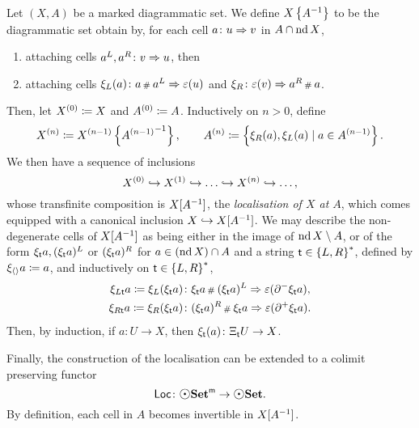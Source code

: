 \begin{dfn}
    Let \( (X, A) \) be a marked diagrammatic set.
    We define \( \preloc{X}{A} \) to be the diagrammatic set obtain by, for each cell \( a \colon u \celto v \) in \( A \cap \nd X \),
    \begin{enumerate}
        \item attaching cells \( a^L, a^R  \colon v \celto u \), then
        \item attaching cells \( \hinv{L}(a) \colon a \cp{} a^L \celto \un(u) \) and \( \hinv{R} \colon \un(v) \celto a^R \cp{} a \).
    \end{enumerate} 
    Then, let \( \order{0}{X} \eqdef X \) and \( \order{0}{A} \eqdef A \).
    Inductively on \( n > 0 \), define
    \begin{equation*}
        \order{n}{X} \eqdef \preloc{\order{n - 1}{X}}{\order{n - 1}{A}}, \quad\quad \order{n}{A} \eqdef \set{\hinv{R}(a), \hinv{L}(a) \mid a \in \order{n - 1}{A}}.
    \end{equation*}
    We then have a sequence of inclusions
    \begin{equation*}
        \order{0}{X} \incl \order{1}{X} \incl \ldots \incl \order{n}{X} \incl \ldots,
    \end{equation*}
    whose transfinite composition is \( \loc{X}{A} \), the \emph{localisation of \( X \) at \( A \)}, which comes equipped with a canonical inclusion \( X \incl \loc{X}{A} \).
    We may describe the non-degenerate cells of \( \loc{X}{A} \) as being either in the image of \( \nd X \setminus A \), or of the form \( \hinv{\s}a, (\hinv{\s}a)^L \) or \( (\hinv{\s}a)^R \) for \( a \in (\nd X) \cap A \) and a string \( \s \in \set{L, R}^* \), defined by \( \hinv{\langle\rangle} a \eqdef a \), and inductively on \( \s \in \set{L, R}^* \),
    \begin{align*}
        \hinv{L\s}a \eqdef \hinv{L}(\hinv{\s}a) &\colon \hinv{\s}a \cp{} (\hinv{\s}a)^L \celto \un(\bd{}{-}\hinv{\s}a),\\
        \hinv{R\s}a \eqdef \hinv{R}(\hinv{\s}a) &\colon (\hinv{\s}a)^R \cp{} \hinv{\s}a \celto \un(\bd{}{+}\hinv{\s}a).
    \end{align*}
    Then, by induction, if \( a \colon U \to X \), then \( \hinv{\s}(a) \colon \hcyl{\s} U \to X \).
    
    Finally, the construction of the localisation can be extended to a colimit preserving functor
    \begin{equation*}
        \Loc \colon \mdgmSet \to \dgmSet.
    \end{equation*}
    By definition, each cell in \( A \) becomes invertible in \( \loc{X}{A} \).
\end{dfn}

